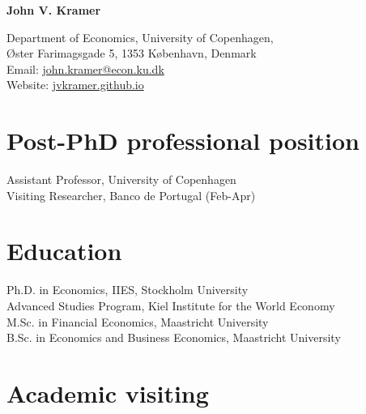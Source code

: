 \documentclass[11pt]{article} %
\begin{document}
\begin{center}
{\LARGE\bfseries John V. Kramer} %
\bigskip%

Department of Economics, University of Copenhagen, \\ 
Øster Farimagsgade 5, 1353 København, Denmark\\



Email: \href{mailto:john.kramer@econ.ku.dk }{john.kramer@econ.ku.dk }\\ %
Website: \href{https://jvkramer.github.io/}{jvkramer.github.io}\\ %
\end{center}


\section*{Post-PhD professional position}

 Assistant Professor, University of Copenhagen \\ %
 Visiting Researcher, Banco de Portugal (Feb-Apr)


\section*{Education}
 {Ph.D. in Economics, IIES, Stockholm University} \\
 Advanced Studies Program, Kiel Institute for the World Economy \\
 M.Sc. in Financial Economics, Maastricht University \\
 B.Sc. in Economics and Business Economics, Maastricht University

\section*{Academic visiting}
\end{document}
